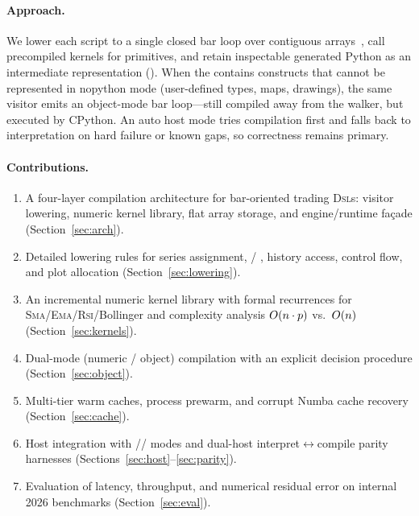 \documentclass[11pt,a4paper]{article}
\begin{document}
\paragraph{Approach.}
We lower each script to a single closed bar loop over contiguous
 arrays~\citep{harris2020numpy}, call precompiled \numba{}
kernels for \ta{} primitives, and retain inspectable generated Python as an
intermediate representation (\ir{}). When the \ast{} contains constructs that
cannot be represented in nopython mode (user-defined types, maps, drawings),
the same visitor emits an object-mode bar loop---still compiled away from the
\ast{} walker, but executed by CPython. An auto host mode tries compilation
first and falls back to interpretation on hard failure or known gaps, so
correctness remains primary.

\paragraph{Contributions.}
\begin{enumerate}[leftmargin=*]
  \item A four-layer compilation architecture for bar-oriented trading
        \textsc{Dsl}s: visitor lowering, numeric kernel library, flat array
        storage, and engine/runtime fa\c{c}ade (Section~\ref{sec:arch}).
  \item Detailed \ast{} lowering rules for series assignment, /
        , history access, control flow, and plot allocation
        (Section~\ref{sec:lowering}).
  \item An incremental numeric kernel library with formal recurrences for
        \textsc{Sma}/\textsc{Ema}/\textsc{Rsi}/Bollinger and complexity
        analysis $O(n\cdot p)$ vs.\ $O(n)$
        (Section~\ref{sec:kernels}).
  \item Dual-mode (numeric / object) compilation with an explicit decision
        procedure (Section~\ref{sec:object}).
  \item Multi-tier warm \ir{} caches, process prewarm, and corrupt Numba
        cache recovery (Section~\ref{sec:cache}).
  \item Host integration with //
        modes and dual-host interpret$\leftrightarrow$compile parity harnesses
        (Sections~\ref{sec:host}--\ref{sec:parity}).
  \item Evaluation of latency, throughput, and numerical residual error on
        internal 2026 benchmarks (Section~\ref{sec:eval}).
\end{enumerate}
\end{document}
